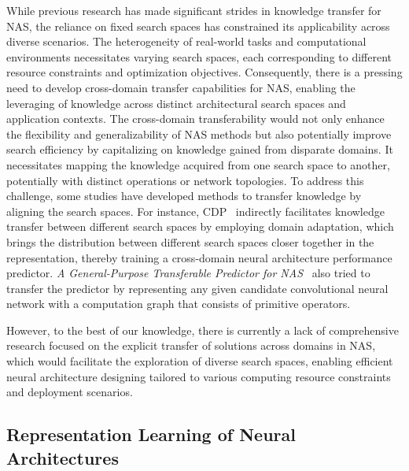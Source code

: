 \documentclass[../main.tex]{subfiles}
\begin{document}
While previous research has made significant strides in knowledge transfer for NAS, the reliance on fixed search spaces has constrained its applicability across diverse scenarios.
The heterogeneity of real-world tasks and computational environments necessitates varying search spaces, each corresponding to different resource constraints and optimization objectives.
Consequently, there is a pressing need to develop cross-domain transfer capabilities for NAS, enabling the leveraging of knowledge across distinct architectural search spaces and application contexts.
The cross-domain transferability would not only enhance the flexibility and generalizability of NAS methods but also potentially improve search efficiency by capitalizing on knowledge gained from disparate domains.
It necessitates mapping the knowledge acquired from one search space to another, potentially with distinct operations or network topologies.
To address this challenge, some studies have developed methods to transfer knowledge by aligning the search spaces.
For instance, CDP~\cite{DBLP:conf/nips/0002TLW022} indirectly facilitates knowledge transfer between different search spaces by employing domain adaptation, which brings the distribution between different search spaces closer together in the representation, thereby training a cross-domain neural architecture performance predictor.
\textit{A General-Purpose Transferable Predictor for NAS}~\cite{DBLP:conf/sdm/HanMCRSZ0JN23} also tried to transfer the predictor by representing any given candidate convolutional neural network with a computation graph that consists of primitive operators.

However, to the best of our knowledge, there is currently a lack of comprehensive research focused on the explicit transfer of solutions across domains in NAS, which would facilitate the exploration of diverse search spaces, enabling efficient neural architecture designing tailored to various computing resource constraints and deployment scenarios. 

\subsection{Representation Learning of Neural Architectures}
\end{document}
